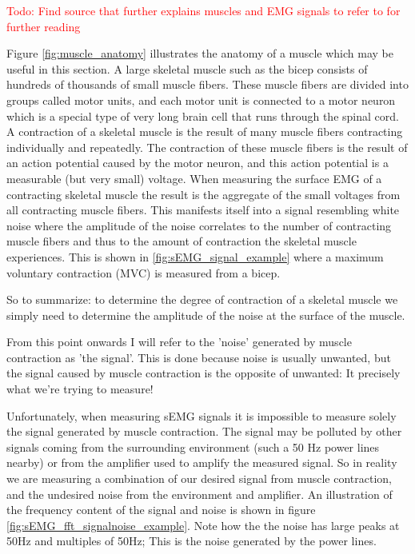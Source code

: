 \textcolor{red}{Todo: Find source that further explains muscles and EMG signals to refer to for further reading}

Figure \ref{fig:muscle_anatomy} illustrates the anatomy of a muscle which may be useful in this section. 
A large skeletal muscle such as the bicep consists of hundreds of thousands of small muscle fibers. These muscle fibers are divided into groups called motor units, and each motor unit is connected to a motor neuron which is a special type of very long brain cell that runs through the spinal cord. A contraction of a skeletal muscle is the result of many muscle fibers contracting individually and repeatedly. The contraction of these muscle fibers is the result of an action potential caused by the motor neuron, and this action potential is a measurable (but very small) voltage. When measuring the surface EMG of a contracting skeletal muscle the result is the aggregate of the small voltages from all contracting muscle fibers. This manifests itself into a signal resembling white noise where the amplitude of the noise correlates to the number of contracting muscle fibers and thus to the amount of contraction the skeletal muscle experiences. This is shown in \ref{fig:sEMG_signal_example} where a maximum voluntary contraction (MVC) is measured from a bicep.
 
So to summarize: to determine the degree of contraction of a skeletal muscle we simply need to determine the amplitude of the noise at the surface of the muscle.

From this point onwards I will refer to the 'noise' generated by muscle contraction as 'the signal'. This is done because noise is usually unwanted, but the signal caused by muscle contraction is the opposite of unwanted: It precisely what we're trying to measure! 

Unfortunately, when measuring sEMG signals it is impossible to measure solely the signal generated by muscle contraction. The signal may be polluted by other signals coming from the surrounding environment (such a 50 Hz power lines nearby) or from the amplifier used to amplify the measured signal. So in reality we are measuring a combination of our desired signal from muscle contraction, and the undesired noise from the environment and amplifier. An illustration of the frequency content of the signal and noise is shown in figure \ref{fig:sEMG_fft_signalnoise_example}. Note how the the noise has large peaks at 50Hz and multiples of 50Hz; This is the noise generated by the power lines. 

